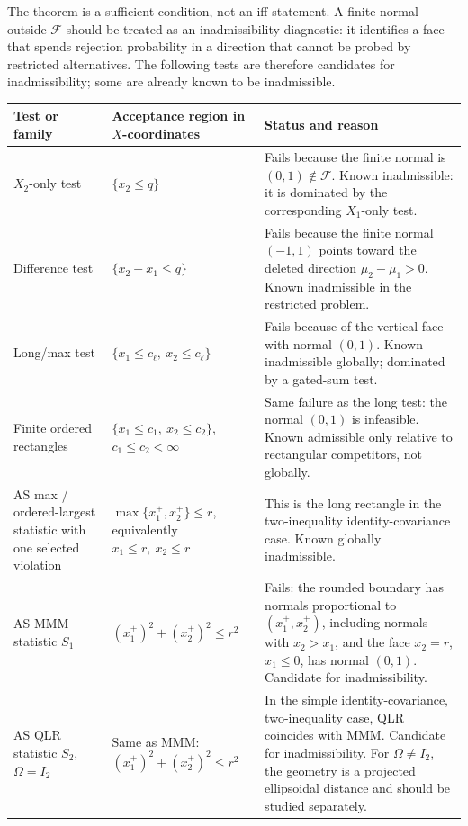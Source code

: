 \documentclass[12pt]{article}
\theoremstyle{remark}
\begin{document}
The theorem is a sufficient condition, not an iff statement. A finite normal outside $\mathcal F$ should be treated as an inadmissibility diagnostic: it identifies a face that spends rejection probability in a direction that cannot be probed by restricted alternatives. The following tests are therefore candidates for inadmissibility; some are already known to be inadmissible.

\begin{center}
\renewcommand{\arraystretch}{1.25}
\begin{tabular}{p{}p{}p{}}
\toprule
Test or family & Acceptance region in $X$-coordinates & Status and reason \\
\midrule
$X_2$-only test & $\{x_2\le q\}$ & Fails because the finite normal is $(0,1)\notin\mathcal F$. Known inadmissible: it is dominated by the corresponding $X_1$-only test. \\
Difference test & $\{x_2-x_1\le q\}$ & Fails because the finite normal $(-1,1)$ points toward the deleted direction $\mu_2-\mu_1>0$. Known inadmissible in the restricted problem. \\
Long/max test & $\{x_1\le c_\ell,\ x_2\le c_\ell\}$ & Fails because of the vertical face with normal $(0,1)$. Known inadmissible globally; dominated by a gated-sum test. \\
Finite ordered rectangles & $\{x_1\le c_1,\ x_2\le c_2\}$, $c_1\le c_2<\infty$ & Same failure as the long test: the normal $(0,1)$ is infeasible. Known admissible only relative to rectangular competitors, not globally. \\
AS max / ordered-largest statistic with one selected violation & $\max\{x_1^+,x_2^+\}\le r$, equivalently $x_1\le r,\ x_2\le r$ & This is the long rectangle in the two-inequality identity-covariance case. Known globally inadmissible. \\
AS MMM statistic $S_1$ & $(x_1^+)^2+(x_2^+)^2\le r^2$ & Fails: the rounded boundary has normals proportional to $(x_1^+,x_2^+)$, including normals with $x_2>x_1$, and the face $x_2=r$, $x_1\le0$, has normal $(0,1)$. Candidate for inadmissibility. \\
AS QLR statistic $S_2$, $\Omega=I_2$ & Same as MMM: $(x_1^+)^2+(x_2^+)^2\le r^2$ & In the simple identity-covariance, two-inequality case, QLR coincides with MMM. Candidate for inadmissibility. For $\Omega\ne I_2$, the geometry is a projected ellipsoidal distance and should be studied separately. \\
\bottomrule
\end{tabular}
\end{center}
\end{document}

